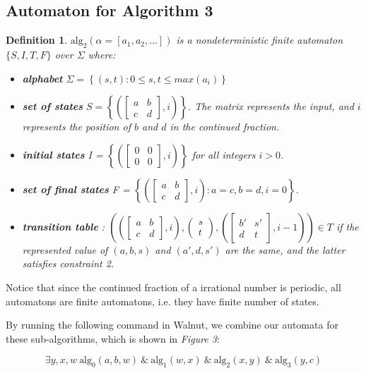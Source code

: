 \documentclass[a4paper]{article}
\newtheorem{definition}{Definition}
\begin{document}
\subsection*{Automaton for Algorithm 3}
\begin{definition}
    $\text{alg}_2(\alpha = [a_1,a_2,\dots])$ is a nondeterministic finite automaton $\{S,I,T,F\}$ over $\Sigma$ where:
    \begin{itemize}
    \item \textbf{alphabet} $\Sigma = \left\{(s,t) : 0\le s,t \le max(a_i) \right\}$
   \item \textbf{set of states} $S = \left\{\left(\begin{bmatrix}a&b\\c&d\end{bmatrix},i\right)\right\}$. The matrix represents the input,  and $i$ represents the position of $b$ and $d$ in the continued fraction.
   \item \textbf{initial states} I = $\left\{\left(\begin{bmatrix}0&0\\0&0\end{bmatrix},i\right)\right\}$ for all integers $i> 0$.
   \item \textbf{set of final states} F = $\left\{\left(\begin{bmatrix}a&b\\c&d\end{bmatrix},i\right):a=c,b=d, i=0\right\}$.
   \item \textbf{transition table} :  $\left(\left(\begin{bmatrix}a&b\\c&d\end{bmatrix},i\right), \begin{pmatrix}s\\t\end{pmatrix}, \left(\begin{bmatrix}b'&s'\\d&t\end{bmatrix},i-1\right)  \right) \in T$ if the represented value of $(a,b,s)$ and $(a',d,s')$ are the same, and the latter satisfies constraint 2.
   \end{itemize}
\end{definition}

Notice that since the continued fraction of a irrational number is periodic, all automatons are finite automatons, i.e. they have finite number of states.

By running the following command in Walnut, we combine our automata for these sub-algorithms, which is shown in \emph{Figure 3}:{

$$\exists y,x,w ~\text{alg}_0(a,b,w) ~\& ~\text{alg}_1(w,x) ~\& ~\text{alg}_2(x,y) ~\& ~\text{alg}_3(y,c)$$}
\end{document}
